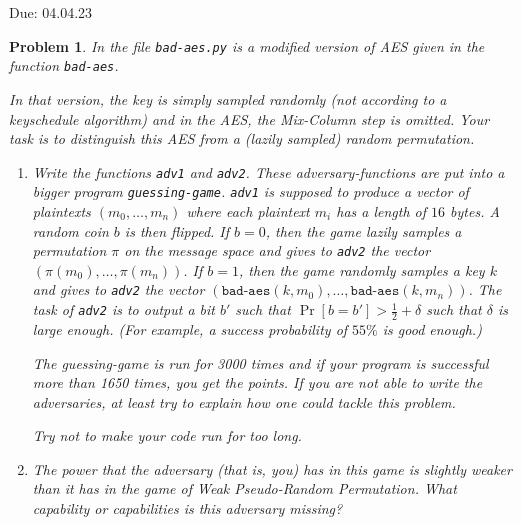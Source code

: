 \documentclass{../homework}
\newtheorem{problem}{Problem}
\begin{document}
{Due: 04.04.23}{\profname}{\myname}

\begin{problem}
    In the file {\tt bad-aes.py} is a modified version of AES given in the
    function {\tt bad-aes}.
    
    In that version, the key is simply sampled randomly (not according to a
    keyschedule algorithm) and in the AES, the Mix-Column step is omitted. Your
    task is to distinguish this AES from a (lazily sampled) random permutation. 
\begin{enumerate}
    \item Write  the functions {\tt adv1} and {\tt adv2}. These
    adversary-functions are put into a bigger program {\tt guessing-game}.
    {\tt adv1} is supposed to produce a vector of plaintexts $(m_0,\dots,m_n)$
    where each plaintext $m_i$ has a length of $16$ bytes. A random coin $b$ is
    then flipped. If $b=0$, then the game lazily samples a permutation $\pi$ on
    the message space and  gives to {\tt adv2} the vector
    $(\pi(m_0),\dots,\pi(m_n))$. If $b=1$, then the game randomly samples a key
    $k$ and  gives to {\tt adv2} the vector
    $(\texttt{bad-aes}(k,m_0),\dots,\texttt{bad-aes}(k,m_n))$. The task of
    {\tt adv2} is to output a bit $b'$ such that $\Pr[b=b']>\frac{1}{2}+\delta$
    such that $\delta$ is large enough. (For example, a success probability of
    $55\%$ is good enough.)
    
    The guessing-game is run for 3000 times and if your program is successful
    more than 1650 times, you get the points. If you are not able to write the
    adversaries, at least try to explain how one could tackle this problem.
    
    Try not to make your code run for too long.

    \item The power that the adversary (that is, you) has in this game is
    slightly weaker than it has in the game of Weak Pseudo-Random Permutation.
    What capability or capabilities is this adversary missing?
\end{enumerate}
\end{problem}
\end{document}
